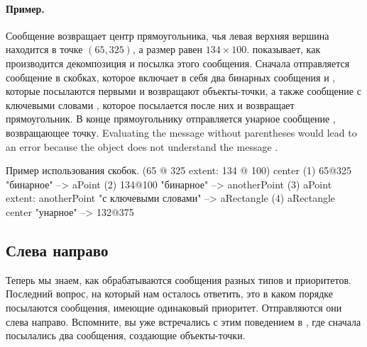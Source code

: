 \documentclass[a4paper,10pt,twoside]{book}
\begin{document}
\paragraph{Пример.}
Сообщение  возвращает центр прямоугольника, чья левая верхняя вершина находится в точке $(65, 325)$, а размер равен $134{\times}100$.  показывает, как производится декомпозиция и посылка этого сообщения. Сначала отправляется сообщение в скобках, которое включает в себя два бинарных сообщения  и , которые посылаются первыми и возвращают объекты-точки, а также сообщение с ключевыми словами , которое посылается после них и возвращает прямоугольник. В конце прямоугольнику отправляется унарное сообщение , возвращающее точку.
Evaluating the message without parentheses would lead to an error because the object  does not understand the message .

\begin{example}[decExtent]{Пример использования скобок.}{}
      (65 @ 325 extent: 134 @ 100) center
(1)   65@325                                                    "бинарное"
    --> aPoint
(2)                                134@100                     "бинарное"
                                 --> anotherPoint
(3)   aPoint extent: anotherPoint                       "с ключевыми словами"
      --> aRectangle
(4)   aRectangle center                                     "унарное"
      --> 132@375
\end{example}

\subsection{Слева направо}
Теперь мы знаем, как обрабатываются сообщения разных типов и приоритетов. Последний вопрос, на который нам осталось ответить, это в каком порядке посылаются сообщения, имеющие одинаковый приоритет. Отправляются они слева направо. Вспомните, вы уже встречались с этим поведением в , где сначала посылались два сообщения, создающие объекты-точки.
\end{document}
